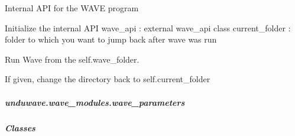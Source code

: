 \documentclass[letterpaper,10pt,english]{sphinxmanual}
\begin{document}
\begin{fulllineitems}
\label{\detokenize{autoapi/unduwave/wave_modules/wave_control/index:unduwave.wave_modules.wave_control.wave_control}}
\pysigstartsignatures
{}
\pysigstopsignatures
\sphinxAtStartPar
Internal API for the WAVE program

\sphinxAtStartPar
Initialize the internal API
wave\_api : external wave\_api class
current\_folder : folder to which you want to jump back after wave was run

\begin{fulllineitems}
\label{\detokenize{autoapi/unduwave/wave_modules/wave_control/index:unduwave.wave_modules.wave_control.wave_control.run}}
\pysigstartsignatures
{}
\pysigstopsignatures
\sphinxAtStartPar
Run Wave from the self.wave\_folder.

\sphinxAtStartPar
If given, change the directory back to self.current\_folder

\end{fulllineitems}


\end{fulllineitems}


\sphinxstepscope


\subparagraph{unduwave.wave\_modules.wave\_parameters}
\label{\detokenize{autoapi/unduwave/wave_modules/wave_parameters/index:module-unduwave.wave_modules.wave_parameters}}\label{\detokenize{autoapi/unduwave/wave_modules/wave_parameters/index:unduwave-wave-modules-wave-parameters}}\label{\detokenize{autoapi/unduwave/wave_modules/wave_parameters/index::doc}}

\subparagraph{Classes}
\label{\detokenize{autoapi/unduwave/wave_modules/wave_parameters/index:classes}}
\end{document}
